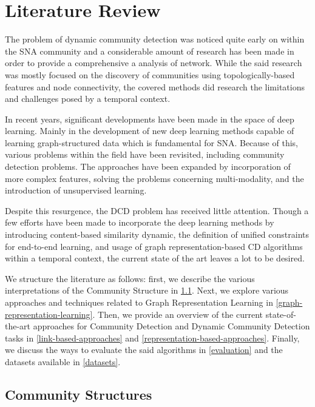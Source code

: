 \documentclass[
acmsmall,
nonacm,
screen,
acmthm]{acmart}
\begin{document}
\hypertarget{literature-review}{%
\section{Literature Review}\label{literature-review}}

The problem of dynamic community detection was noticed quite early on
within the SNA community and a considerable amount of research has been
made in order to provide a comprehensive a analysis of network. While
the said research was mostly focused on the discovery of communities
using topologically-based features and node connectivity, the covered
methods did research the limitations and challenges posed by a temporal
context.

In recent years, significant developments have been made in the space of
deep learning. Mainly in the development of new deep learning methods
capable of learning graph-structured data
\citep{bronsteinGeometricDeepLearning2017, hamiltonRepresentationLearningGraphs2018, kipfSemiSupervisedClassificationGraph2017}
which is fundamental for SNA. Because of this, various problems within
the field have been revisited, including community detection problems.
The approaches have been expanded by incorporation of more complex
features, solving the problems concerning multi-modality, and the
introduction of unsupervised learning.

Despite this resurgence, the DCD problem has received little attention.
Though a few efforts have been made to incorporate the deep learning
methods by introducing content-based similarity dynamic, the definition
of unified constraints for end-to-end learning, and usage of graph
representation-based CD algorithms within a temporal context, the
current state of the art leaves a lot to be desired.

We structure the literature as follows: first, we describe the various
interpretations of the Community Structure in
\cref{community-structures}. Next, we explore various approaches and
techniques related to Graph Representation Learning in
\cref{graph-representation-learning}. Then, we provide an overview of
the current state-of-the-art approaches for Community Detection and
Dynamic Community Detection tasks in \cref{link-based-approaches} and
\cref{representation-based-approaches}. Finally, we discuss the ways to
evaluate the said algorithms in \cref{evaluation} and the datasets
available in \cref{datasets}.

\hypertarget{community-structures}{%
\subsection{Community Structures}\label{community-structures}}
\end{document}
